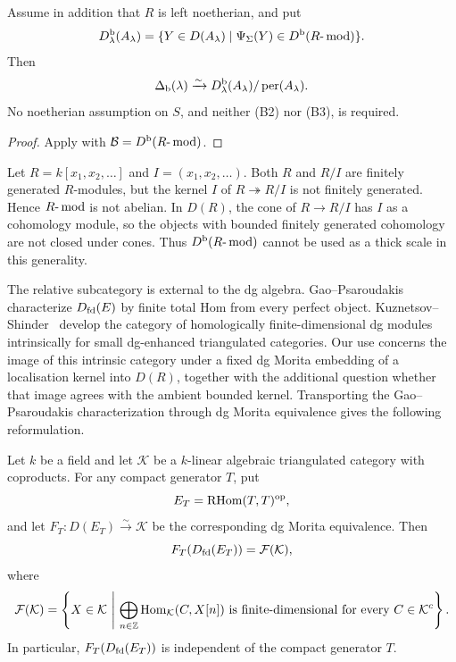 \begin{corollary}\label{cor:relative-dg-bounded}
Assume in addition that \(R\) is left noetherian, and put
\[
 D^{\mathrm b}_\lambda(A_\lambda)
 =\{Y\in D(A_\lambda)\mid
   \Psi_\Sigma(Y)\in D^{\mathrm b}(R\text{-}\operatorname{mod})\}.
\]
Then
\[
 \Delta_{\mathrm b}(\lambda)
 \xrightarrow{\sim}
 D^{\mathrm b}_\lambda(A_\lambda)/\operatorname{per}(A_\lambda).
\]
No noetherian assumption on \(S\), and neither \textup{(B2)} nor \textup{(B3)}, is required.
\end{corollary}

\begin{proof}
Apply  with \(\mathcal B=D^{\mathrm b}(R\text{-}\operatorname{mod})\).
\end{proof}

\begin{remark}\label{rem:nonnoetherian-bounded-scale}
Let \(R=k[x_1,x_2,\ldots]\) and \(I=(x_1,x_2,\ldots)\).  Both \(R\) and \(R/I\) are finitely generated \(R\)-modules, but the kernel \(I\) of \(R\twoheadrightarrow R/I\) is not finitely generated.  Hence \(R\text{-}\operatorname{mod}\) is not abelian.  In \(D(R)\), the cone of \(R\to R/I\) has \(I\) as a cohomology module, so the objects with bounded finitely generated cohomology are not closed under cones.  Thus \(D^{\mathrm b}(R\text{-}\operatorname{mod})\) cannot be used as a thick scale in this generality.
\end{remark}

The relative subcategory is external to the dg algebra.  Gao--Psaroudakis~\cite[Lemma~4.1]{GaoPsaroudakis18} characterize \(D_{\mathrm{fd}}(E)\) by finite total Hom from every perfect object.  Kuznetsov--Shinder~\cite{KuznetsovShinder25} develop the category of homologically finite-dimensional dg modules intrinsically for small dg-enhanced triangulated categories.  Our use concerns the image of this intrinsic category under a fixed dg Morita embedding of a localisation kernel into \(D(R)\), together with the additional question whether that image agrees with the ambient bounded kernel.  Transporting the Gao--Psaroudakis characterization through dg Morita equivalence gives the following reformulation.

\begin{proposition}\label{prop:finite-total-hom}
Let \(k\) be a field and let \(\mathcal K\) be a \(k\)-linear algebraic triangulated category with coproducts.  For any compact generator \(T\), put
\[
 E_T=\operatorname{RHom}(T,T)^{\mathrm{op}},
\]
and let \(F_T:D(E_T)\xrightarrow{\sim}\mathcal K\) be the corresponding dg Morita equivalence.  Then
\[
 F_T(D_{\mathrm{fd}}(E_T))=\mathcal F(\mathcal K),
\]
where
\begin{equation}\label{eq:finite-hom-subcategory}
 \mathcal F(\mathcal K)
 =\left\{
 X\in\mathcal K\ \middle|\
 \bigoplus_{n\in\mathbb Z}\operatorname{Hom}_{\mathcal K}(C,X[n])
 \text{ is finite-dimensional for every }C\in\mathcal K^c
 \right\}.
\end{equation}
In particular, \(F_T(D_{\mathrm{fd}}(E_T))\) is independent of the compact generator \(T\).
\end{proposition}

